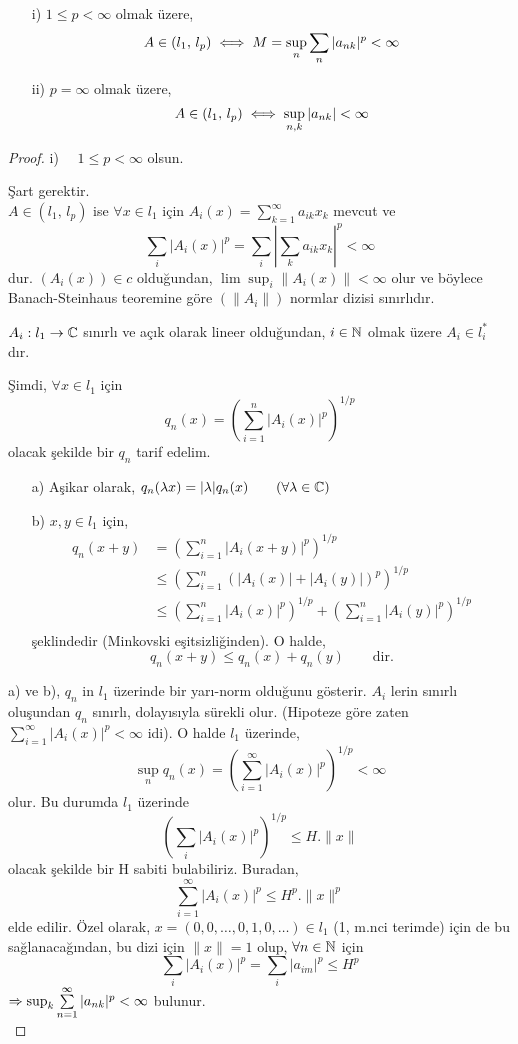 \begin{theorem}
\begin{itemize}
\item[i)] $1\leq p<\infty$ olmak üzere,
$$
A\in(l_1,\,l_p)\iff M=\sup_n\sum_n|a_{nk}|^p<\infty
$$
\item [ii)] $p=\infty$ olmak üzere,
$$
A\in(l_1,\,l_p)\iff\sup_{n,k}|a_{nk}|<\infty
$$
\end{itemize}
\end{theorem}

\begin{proof}
i) $\quad1\leq p<\infty$ olsun.

Şart gerektir.\\[5pt]
$A\in(l_1,\,l_p)$ ise $\forall x\in l_1$ için $A_i(x)=\sum\limits_{k=1}^\infty a_{ik}x_k$ mevcut ve $$\sum\limits_i|A_i(x)|^p=\sum_i\left|\sum_ka_{ik}x_k\right|^p<\infty$$ dur. $(A_i(x))\in c$ olduğundan, $\lim\sup_i\|A_i(x)\|<\infty$ olur ve böylece Banach-Steinhaus teoremine göre $\left(\|A_i\|\right)$ normlar dizisi sınırlıdır.

$A_i:l_1\to \mathbb{C}$ sınırlı ve açık olarak lineer olduğundan, $i\in\mathbb{N}$ olmak üzere $A_i\in l_i^*$ dır.

Şimdi, $\forall x\in l_1$ için $$q_n(x)=\left(\sum\limits_{i=1}^n|A_i(x)|^p\right)^{1/p}$$ olacak şekilde bir $q_n$ tarif edelim.\\[3pt]
\begin{itemize}
\item[a)] Aşikar olarak, $q_n(\lambda x)=|\lambda|q_n(x)\qquad(\forall \lambda\in\mathbb{C})$\\[2pt]
\item[b)] $x,y\in l_1$ için,
$$\begin{aligned}
 q_n(x+y)&=\left(\sum\limits_{i=1}^n|A_i(x+y)|^p\right)^{1/p}\\
&\leq\left(\sum\limits_{i=1}^n(|A_i(x)|+|A_i(y)|)^p\right)^{1/p}\\
&\leq\left(\sum\limits_{i=1}^n|A_i(x)|^p\right)^{1/p}+\left(\sum\limits_{i=1}^n|A_i(y)|^p\right)^{1/p}\\
\end{aligned}$$
şeklindedir (Minkovski eşitsizliğinden). O halde,
$$
q_n(x+y)\leq q_n(x)+q_n(y)\qquad\text{dir.}
$$
\end{itemize}
a) ve b), $q_n$ in $l_1$ üzerinde bir yarı-norm olduğunu gösterir. $A_i$ lerin sınırlı oluşundan $q_n$ sınırlı, dolayısıyla sürekli olur. (Hipoteze göre zaten $\sum\limits_{i=1}^\infty |A_i(x)|^p<\infty$ idi). O halde $l_1$ üzerinde,
$$
\sup_nq_n(x)=\left(\sum\limits_{i=1}^\infty |A_i(x)|^p\right)^{1/p}<\infty
$$
olur. Bu durumda $l_1$ üzerinde 
$$
\left(\sum\limits_i |A_i(x)|^p\right)^{1/p}\leq H.\|x\|
$$
olacak şekilde bir H sabiti bulabiliriz. Buradan,
$$
\sum\limits_{i=1}^\infty |A_i(x)|^p\leq H^p.\|x\|^p
$$
elde edilir. Özel olarak, $x=(0,0,\ldots,0,1,0,\ldots)\in l_1$ (1, m.nci terimde) için de bu sağlanacağından, bu dizi için $\|x\|=1$ olup, $\forall n\in\mathbb{N}$ için
$$
\sum\limits_i |A_i(x)|^p=\sum\limits_i |a_{im}|^p\leq H^p
$$
$\Rightarrow\sup_k\sum\limits_{n=1}^\infty|a_{nk}|^p<\infty$ bulunur.\\[5pt]


\end{proof}
